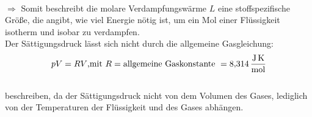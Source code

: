 \\$\Rightarrow$ Somit beschreibt die molare Verdampfungswärme $L$ eine stoffspezifische Größe, die angibt, wie viel Energie nötig ist,
um ein Mol einer Flüssigkeit isotherm und isobar zu verdampfen.\\
Der Sättigungsdruck lässt sich nicht durch die allgemeine Gasgleichung:
\begin{equation}
    pV=RV\text{,mit }R=\text{allgemeine Gaskonstante }= \SI{8.314}{\joule\per\mole\kelvin}\\
    \label{eqn:Gasgl}
\end{equation}
\\
beschreiben, da der Sättigungsdruck nicht von dem Volumen des Gases, lediglich von der Temperaturen der Flüssigkeit 
und des Gases abhängen.
\\

